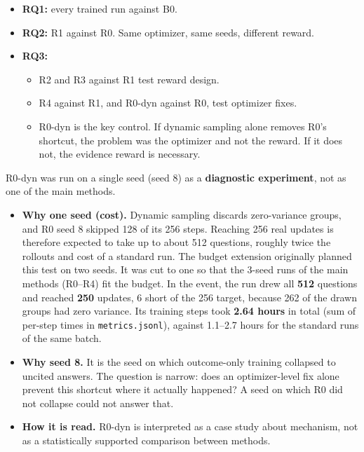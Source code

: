 \begin{itemize}
\tightlist
\item
  \textbf{RQ1:} every trained run against B0.
\item
  \textbf{RQ2:} R1 against R0. Same optimizer, same seeds, different
  reward.
\item
  \textbf{RQ3:}

  \begin{itemize}
  \tightlist
  \item
    R2 and R3 against R1 test reward design.
  \item
    R4 against R1, and R0-dyn against R0, test optimizer fixes.
  \item
    R0-dyn is the key control. If dynamic sampling alone removes R0's
    shortcut, the problem was the optimizer and not the reward. If it
    does not, the evidence reward is necessary.
  \end{itemize}
\end{itemize}

R0-dyn was run on a single seed (seed 8) as a \textbf{diagnostic
experiment}, not as one of the main methods.

\begin{itemize}
\tightlist
\item
  \textbf{Why one seed (cost).} Dynamic sampling discards zero-variance
  groups, and R0 seed 8 skipped 128 of its 256 steps. Reaching 256 real
  updates is therefore expected to take up to about 512 questions,
  roughly twice the rollouts and cost of a standard run. The budget
  extension originally planned this test on two seeds. It was cut to one
  so that the 3-seed runs of the main methods (R0--R4) fit the budget.
  In the event, the run drew all \textbf{512} questions and reached
  \textbf{250} updates, 6 short of the 256 target, because 262 of the
  drawn groups had zero variance. Its training steps took \textbf{2.64
  hours} in total (sum of per-step times in
  \texttt{metrics.\allowbreak{}jsonl}), against 1.1--2.7 hours for the
  standard runs of the same batch.
\item
  \textbf{Why seed 8.} It is the seed on which outcome-only training
  collapsed to uncited answers. The question is narrow: does an
  optimizer-level fix alone prevent this shortcut where it actually
  happened? A seed on which R0 did not collapse could not answer that.
\item
  \textbf{How it is read.} R0-dyn is interpreted as a case study about
  mechanism, not as a statistically supported comparison between
  methods.
\end{itemize}

